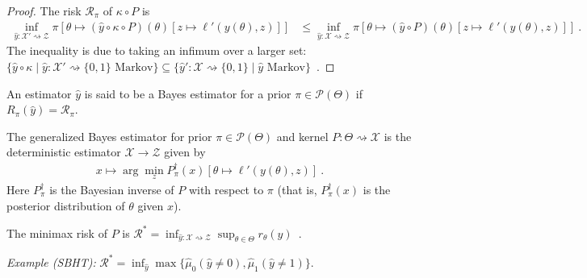 \begin{proof}\leanok
\uses{}
The risk $\mathcal R_\pi$ of $\kappa \circ P$ is
\begin{align*}
\inf_{\hat{y} : \mathcal X' \rightsquigarrow \mathcal Z} \pi\left[\theta \mapsto (\hat{y} \circ \kappa \circ P)(\theta)\left[z \mapsto \ell'(y(\theta), z)\right]\right]
&\le \inf_{\hat{y} : \mathcal X \rightsquigarrow \mathcal Z} \pi\left[\theta \mapsto (\hat{y} \circ P)(\theta)\left[z \mapsto \ell'(y(\theta), z)\right]\right]
\: .
\end{align*}
The inequality is due to taking an infimum over a larger set: $\{\hat{y} \circ \kappa \mid \hat{y} : \mathcal X' \rightsquigarrow \{0,1\} \text{ Markov}\} \subseteq \{\hat{y}' : \mathcal X \rightsquigarrow \{0,1\} \mid \hat{y} \text{ Markov}\}$~.
\end{proof}


\begin{definition}
  \label{def:bayesEstimator}
  \leanok
  An estimator $\hat{y}$ is said to be a Bayes estimator for a prior $\pi \in \mathcal P(\Theta)$ if $R_\pi(\hat{y}) = \mathcal R_\pi$.
\end{definition}

\begin{definition}
  \label{def:genBayesEstimator}
  The generalized Bayes estimator for prior $\pi \in \mathcal P(\Theta)$ and kernel $P: \Theta \rightsquigarrow \mathcal X$ is the deterministic estimator $\mathcal X \to \mathcal Z$ given by
  \begin{align*}
  x \mapsto \arg\min_z P_\pi^\dagger(x)\left[\theta \mapsto \ell'(y(\theta), z)\right] \: .
  \end{align*}
  Here $P_\pi^\dagger$ is the Bayesian inverse of $P$ with respect to $\pi$ (that is, $P_\pi^\dagger(x)$ is the posterior distribution of $\theta$ given $x$).
\end{definition}

\begin{definition}
  \label{def:minimaxRisk}
  \leanok
  The minimax risk of $P$ is $\mathcal R^* = \inf_{\hat{y} : \mathcal X \rightsquigarrow \mathcal Z} \sup_{\theta \in \Theta} r_\theta(\hat{y})$~.
\end{definition}

\emph{Example (SBHT):} $\mathcal R^* = \inf_{\hat{y}} \max\{\hat{\mu}_0(\hat{y} \ne 0), \hat{\mu}_1(\hat{y} \ne 1)\}$.

